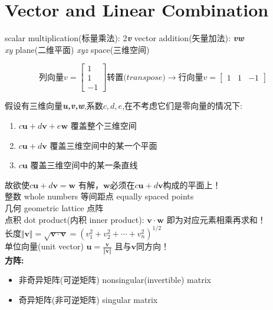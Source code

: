     \section{Vector and Linear Combination}
    scalar multiplication(标量乘法): 2\textbf{\textit{v}}
    \quad
    vector addition(矢量加法): \textbf{\textit{vw}}
    \\
    \textit{xy} plane(二维平面) \quad \textit{xyz} space(三维空间)
     
    $$
    \textit{列向量v} =
    \begin{bmatrix}
        1 \\ 1 \\ -1  
    \end{bmatrix}
    \textit{转置(transpose)}\rightarrow
    \textit{行向量v} = 
    \begin{bmatrix}
        1 & 1 & -1
    \end{bmatrix}
    $$

    假设有三维向量\textbf{\textit{u,v,w}},系数$c,d,e$,在不考虑它们是零向量的情况下:
    \begin{enumerate}
            \item $c\bm{u}+d\bm{v}+e\bm{w}$ 覆盖整个三维空间
            \item $c\bm{u}+d\bm{v}$ 覆盖三维空间中的某一个平面
            \item $c\bm{u}$ 覆盖三维空间中的某一条直线
    \end{enumerate}
    故欲使$c\bm{u}+d\bm{v} = \bm{w}$ 有解，$\bm{w}$必须在$c\bm{u}+d\bm{v}$构成的平面上！
    \\
    整数 whole numbers \quad 等间距点 equally spaced points
    \\
    几何 geometric \quad lattice 点阵
    \\
    点积 dot product(内积 inner product): $\bm{v} \cdot \bm{w}$ 即为对应元素相乘再求和！
    \\
    长度$\Vert \bm{v} \Vert = \sqrt{\bm{v \cdot v}} = (v_{1}^{2}+v_{2}^{2}+\cdots+v_{n}^{2})^{1/2}$ 
    \\
    单位向量(unit vector) $\bm{u} = \frac{\bm{v}}{ \Vert \bm{v} \Vert}$ 且与$\bm{v}$同方向！ \\
    \textbf{方阵:}
    \begin{itemize}
        \item 非奇异矩阵(可逆矩阵) nonsingular(invertible) matrix
        \item 奇异矩阵(非可逆矩阵) singular matrix
    \end{itemize}